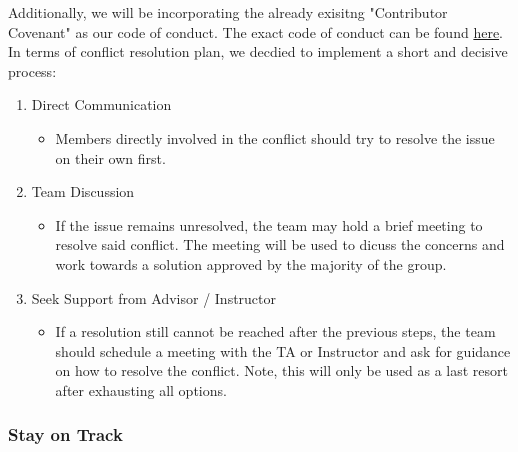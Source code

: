 \documentclass{article}
\begin{document}
Additionally, we will be incorporating the already exisitng "Contributor Covenant" as our code of conduct. The exact code of conduct can be found \href{https://www.contributor-covenant.org/version/2/1/code_of_conduct/}{here}. \\

In terms of conflict resolution plan, we decdied to implement a short and decisive process: \\
\begin{enumerate}
  \item Direct Communication
  \begin{itemize}
    \item Members directly involved in the conflict should try to resolve the issue on their own first. 
  \end{itemize}
  \item Team Discussion
  \begin{itemize}
    \item If the issue remains unresolved, the team may hold a brief meeting to resolve said conflict. The meeting will be used to dicuss the concerns and work towards a solution approved by the majority of the group.
  \end{itemize}
  \item Seek Support from Advisor / Instructor
  \begin{itemize}
    \item If a resolution still cannot be reached after the previous steps, the team should schedule a meeting with the TA or Instructor and ask for guidance on how to resolve the conflict. Note, this will only be used as a last resort after exhausting all options.
  \end{itemize}
\end{enumerate}

\subsubsection*{Stay on Track}


\end{document}

